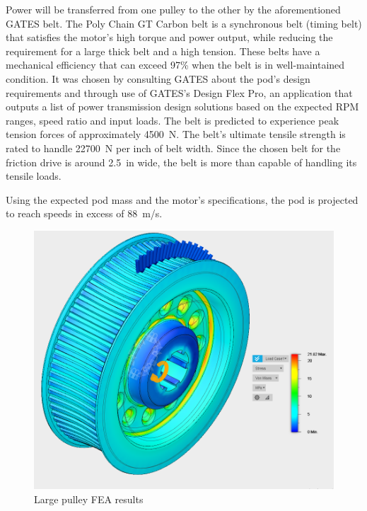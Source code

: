 \documentclass[main.tex]{subfiles}
\begin{document}
Power will be transferred from one pulley to the other by the aforementioned GATES belt. The Poly Chain GT Carbon belt is a synchronous belt (timing belt) that satisfies the motor's high torque and power output, while reducing the requirement for a large thick belt and a high tension. These belts have a mechanical efficiency that can exceed 97\% when the belt is in well-maintained condition. It was chosen by consulting GATES about the pod's design requirements and through use of GATES's Design Flex Pro, an application that outputs a list of power transmission design solutions based on the expected RPM ranges, speed ratio and input loads. The belt is predicted to experience peak tension forces of approximately \SI{4500}{N}. The belt’s ultimate tensile strength is rated to handle \SI{22700}{N} per inch of belt width. Since the chosen belt for the friction drive is around \SI{2.5}{in} wide, the belt is more than capable of handling its tensile loads.

Using the expected pod mass and the motor's specifications, the pod is projected to reach speeds in excess of \SI{88}{m/s}.\\

	\begin{figure}
        \centering
        \includegraphics[width=0.75\linewidth]{images/pulley}
        \caption{Large pulley FEA results}
        \label{fig:pulley2}
    \end{figure}
\end{document}
